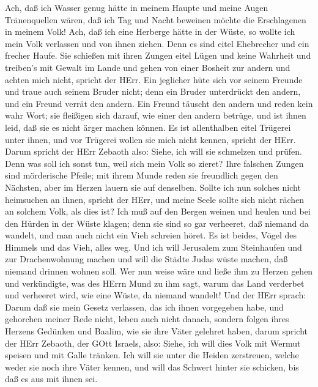  Ach, daß ich Wasser genug hätte in meinem Haupte und meine
Augen Tränenquellen wären, daß ich Tag und Nacht beweinen möchte die
Erschlagenen in meinem Volk!  Ach, daß ich eine Herberge
hätte in der Wüste, so wollte ich mein Volk verlassen und von ihnen
ziehen. Denn es sind eitel Ehebrecher und ein frecher Haufe.
 Sie schießen mit ihren Zungen eitel Lügen und keine
Wahrheit und treiben's mit Gewalt im Lande und gehen von einer Bosheit
zur andern und achten mich nicht, spricht der HErr.  Ein
jeglicher hüte sich vor seinem Freunde und traue auch seinem Bruder
nicht; denn ein Bruder unterdrückt den andern, und ein Freund verrät den
andern.  Ein Freund täuscht den andern und reden kein wahr
Wort; sie fleißigen sich darauf, wie einer den andern betrüge, und ist
ihnen leid, daß sie es nicht ärger machen können.  Es ist
allenthalben eitel Trügerei unter ihnen, und vor Trügerei wollen sie
mich nicht kennen, spricht der HErr.  Darum spricht der HErr
Zebaoth also: Siehe, ich will sie schmelzen und prüfen. Denn was soll
ich sonst tun, weil sich mein Volk so zieret?  Ihre falschen
Zungen sind mörderische Pfeile; mit ihrem Munde reden sie freundlich
gegen den Nächsten, aber im Herzen lauern sie auf denselben.
 Sollte ich nun solches nicht heimsuchen an ihnen, spricht
der HErr, und meine Seele sollte sich nicht rächen an solchem Volk, als
dies ist?  Ich muß auf den Bergen weinen und heulen und bei
den Hürden in der Wüste klagen; denn sie sind so gar verheeret, daß
niemand da wandelt, und man auch nicht ein Vieh schreien höret. Es ist
beides, Vögel des Himmels und das Vieh, alles weg.  Und ich
will Jerusalem zum Steinhaufen und zur Drachenwohnung machen und will
die Städte Judas wüste machen, daß niemand drinnen wohnen soll.
 Wer nun weise wäre und ließe ihm zu Herzen gehen und
verkündigte, was des HErrn Mund zu ihm sagt, warum das Land verderbet
und verheeret wird, wie eine Wüste, da niemand wandelt! 
Und der HErr sprach: Darum daß sie mein Gesetz verlassen, das ich ihnen
vorgegeben habe, und gehorchen meiner Rede nicht, leben auch nicht
danach,  sondern folgen ihres Herzens Gedünken und Baalim,
wie sie ihre Väter gelehret haben,  darum spricht der HErr
Zebaoth, der GOtt Israels, also: Siehe, ich will dies Volk mit Wermut
speisen und mit Galle tränken.  Ich will sie unter die
Heiden zerstreuen, welche weder sie noch ihre Väter kennen, und will das
Schwert hinter sie schicken, bis daß es aus mit ihnen sei. 
